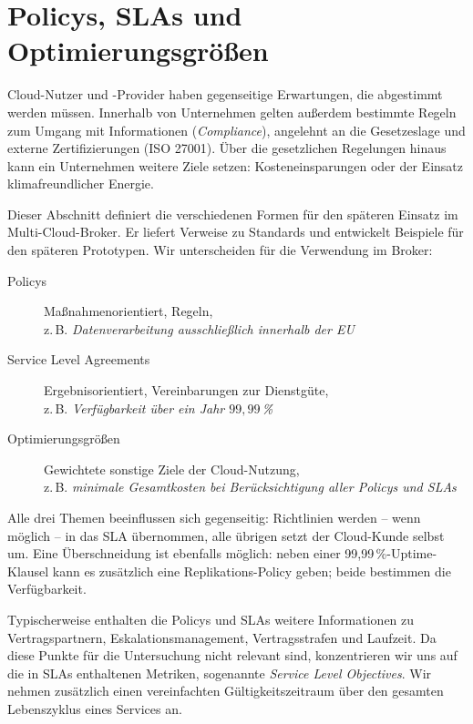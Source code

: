

\section{Policys, SLAs und Optimierungsgrößen}

Cloud-Nutzer und -Provider haben gegenseitige Erwartungen, die abgestimmt werden müssen. Innerhalb von Unternehmen gelten außerdem bestimmte Regeln zum Umgang mit Informationen (\emph{Compliance}), angelehnt an die Gesetzeslage und externe Zertifizierungen (ISO 27001). Über die gesetzlichen Regelungen hinaus kann ein Unternehmen weitere Ziele setzen: Kosteneinsparungen oder der Einsatz klimafreundlicher Energie. 

Dieser Abschnitt definiert die verschiedenen Formen für den späteren Einsatz im Multi-Cloud-Broker. Er liefert Verweise zu Standards und entwickelt Beispiele für den späteren Prototypen. Wir unterscheiden für die Verwendung im Broker:

\begin{description}
	\item[Policys] Maßnahmenorientiert, Regeln, \\
	z.\,B. \emph{Datenverarbeitung ausschließlich innerhalb der EU}
	\item[Service Level Agreements] Ergebnisorientiert, Vereinbarungen zur Dienstgüte, \\
	z.\,B. \emph{Verfügbarkeit über ein Jahr $99,99\,$\%}
	\item[Optimierungsgrößen] Gewichtete sonstige Ziele der Cloud-Nutzung, \\
	z.\,B. \emph{minimale Gesamtkosten bei Berücksichtigung aller Policys und SLAs}
\end{description}

\noindent Alle drei Themen beeinflussen sich gegenseitig: Richtlinien werden -- wenn möglich -- in das SLA übernommen, alle übrigen setzt der Cloud-Kunde selbst um. Eine Überschneidung ist ebenfalls möglich: neben einer 99,99\,\%-Uptime-Klausel kann es zusätzlich eine Replikations-Policy geben; beide bestimmen die Verfügbarkeit.

Typischerweise enthalten die Policys und SLAs weitere Informationen zu Vertragspartnern, Eskalationsmanagement, Vertragsstrafen und Laufzeit. Da diese Punkte für die Untersuchung nicht relevant sind, konzentrieren wir uns auf die in SLAs enthaltenen Metriken, sogenannte \emph{Service Level Objectives}. Wir nehmen zusätzlich einen vereinfachten Gültigkeitszeitraum über den gesamten Lebenszyklus eines Services an. 

